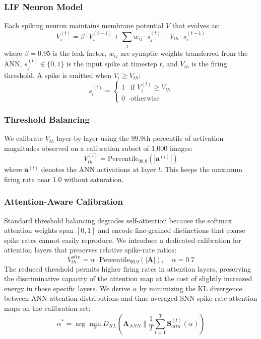 \documentclass[11pt,a4paper]{article}
\begin{document}
\subsubsection{LIF Neuron Model}
Each spiking neuron maintains membrane potential $V$ that evolves as:
\begin{equation}
    V_i^{(t)} = \beta \cdot V_i^{(t-1)} + \sum_j w_{ij} \cdot s_j^{(t)} - V_{th} \cdot s_i^{(t-1)}
\end{equation}
where $\beta = 0.95$ is the leak factor, $w_{ij}$ are synaptic weights transferred from the ANN, $s_j^{(t)} \in \{0,1\}$ is the input spike at timestep $t$, and $V_{th}$ is the firing threshold. A spike is emitted when $V_i \geq V_{th}$:
\begin{equation}
    s_i^{(t)} = \begin{cases} 1 & \text{if } V_i^{(t)} \geq V_{th} \\ 0 & \text{otherwise} \end{cases}
\end{equation}

\subsubsection{Threshold Balancing}
We calibrate $V_{th}$ layer-by-layer using the 99.9th percentile of activation magnitudes observed on a calibration subset of 1,000 images:
\begin{equation}
    V_{th}^{(l)} = \text{Percentile}_{99.9}\left(|\mathbf{a}^{(l)}|\right)
\end{equation}
where $\mathbf{a}^{(l)}$ denotes the ANN activations at layer $l$. This keeps the maximum firing rate near 1.0 without saturation.

\subsubsection{Attention-Aware Calibration}
Standard threshold balancing degrades self-attention because the softmax attention weights span $[0,1]$ and encode fine-grained distinctions that coarse spike rates cannot easily reproduce. We introduce a dedicated calibration for attention layers that preserves relative spike-rate ratios:
\begin{equation}
    V_{th}^{attn} = \alpha \cdot \text{Percentile}_{99.9}(|\mathbf{A}|), \quad \alpha = 0.7
\end{equation}
The reduced threshold permits higher firing rates in attention layers, preserving the discriminative capacity of the attention map at the cost of slightly increased energy in those specific layers. We derive $\alpha$ by minimizing the KL divergence between ANN attention distributions and time-averaged SNN spike-rate attention maps on the calibration set:
\begin{equation}
    \alpha^* = \arg\min_\alpha D_{KL}\left(\mathbf{A}_{ANN} \| \frac{1}{T}\sum_{t=1}^{T}\mathbf{S}_{attn}^{(t)}(\alpha)\right)
\end{equation}
\end{document}
